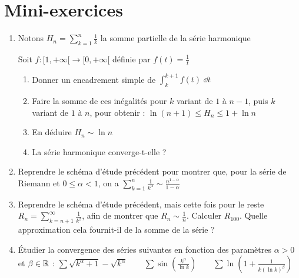 \section{Mini-exercices}

\begin{frame}
\begin{miniexercice}
\begin{enumerate}
  \item Notons $H_n = \sum_{k=1}^{n} \frac 1k$ la somme partielle de la série harmonique
  
  Soit $f : [1,+\infty[\to[0,+\infty[$ définie par $f(t)=\frac1t$
  \begin{enumerate}
    \item Donner un encadrement simple de $\int_k^{k+1} f(t) \;\dd t$
    \item Faire la somme de ces inégalités pour $k$ variant de $1$ à $n-1$, puis $k$ variant de $1$
  à $n$, pour obtenir : $\ln(n+1) \le H_n \le1 + \ln n$
    \item En déduire $H_n \sim \ln n$
    \item La série harmonique converge-t-elle ?
   \end{enumerate}
  
  \item Reprendre le schéma d'étude précédent pour montrer que, pour la série de Riemann 
  et $0\le \alpha <1$, on a
  $\sum_{k=1}^{n} \frac{1}{k^\alpha} \sim \frac{n^{1-\alpha}}{1-\alpha}$
  
  \item Reprendre le schéma d'étude précédent, mais cette fois pour le reste
  $R_n = \sum_{k=n+1}^{\infty} \frac{1}{k^2}$, afin de montrer que
  $R_n \sim \frac{1}{n}.$
  Calculer $R_{100}$. Quelle approximation cela fournit-il de la somme de la série ?
  
  \item \'Etudier la convergence des séries suivantes en fonction des paramètres $\alpha>0$ et $\beta \in \mathbb{R}$ :
  $\sum \sqrt{k^\alpha+1}-\sqrt{k^\alpha} \qquad
  \sum \sin\left(\frac{k^\alpha}{\ln k}\right) \qquad
  \sum \ln \left(1+\frac{1}{k(\ln k)^\beta}\right)$
  
  
\end{enumerate}
\end{miniexercice}
\end{frame}

